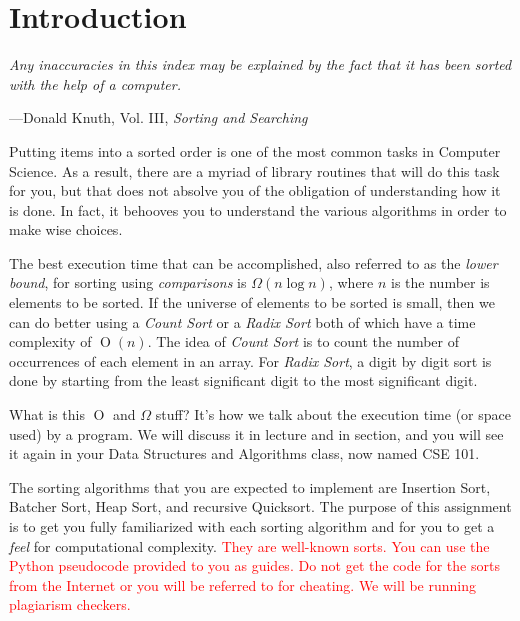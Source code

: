 \section{Introduction}

\textwidth
\epigraph{\emph{Any inaccuracies in this index may be explained by the
fact that it has been sorted with the help of a computer.}}{---Donald
Knuth, Vol.  III, \emph{Sorting and Searching}}

\noindent Putting items into a sorted order is one of the most common
tasks in Computer Science. As a result, there are a myriad of library
routines that will do this task for you, but that does not absolve you
of the obligation of understanding how it is done. In fact, it behooves
you to understand the various algorithms in order to make wise choices.

The best execution time that can be accomplished, also referred to as
the \emph{lower bound}, for sorting using \emph{comparisons} is
$\Omega(n \log n)$, where $n$ is the number is elements to be sorted. If
the universe of elements to be sorted is small, then we can do better
using a \emph{Count Sort} or a \emph{Radix Sort} both of which have a
time complexity of $\operatorname{O}(n)$. The idea of \emph{Count Sort}
is to count the number of occurrences of each element in an array. For
\emph{Radix Sort}, a digit by digit sort is done by starting from the
least significant digit to the most significant digit.

What is this $\operatorname{O}$ and $\Omega$ stuff? It's how we talk
about the execution time (or space used) by a program. We will discuss
it in lecture and in section, and you will see it again in your Data
Structures and Algorithms class, now named CSE 101.

The sorting algorithms that you are expected to implement are Insertion Sort,
Batcher Sort, Heap Sort, and recursive Quicksort. The purpose of this assignment
is to get you fully familiarized with each sorting algorithm and for you to get
a \emph{feel} for computational complexity. \textcolor{red}{They are well-known
sorts. You can use the Python pseudocode provided to you as guides. Do not get
the code for the sorts from the Internet or you will be referred to for
cheating. We will be running plagiarism checkers.}

